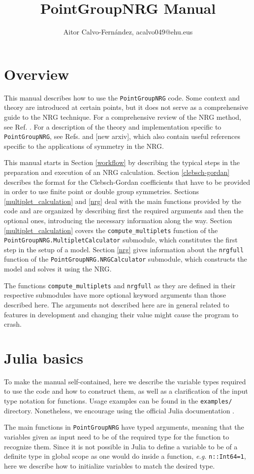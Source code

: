 \documentclass[notitlepage]{article}
\title{PointGroupNRG Manual}
\author{Aitor Calvo-Fernández, acalvo049@ehu.eus}
\begin{document}
\maketitle

\tableofcontents

\section{Overview}\label{overview}
This manual describes how to use the \texttt{PointGroupNRG}
code. Some context and theory are introduced at certain
points, but it does not serve as a comprehensive guide to
the NRG technique. For a comprehensive review of the NRG method, see
Ref. \cite{bulla2008}. For a description of the theory and
implementation specific to \texttt{PointGroupNRG}, see Refs.
\cite{calvo-fernandez2024} and [new arxiv], which also
contain useful references specific to the applications of
symmetry in the NRG.
\par
This manual starts in Section \ref{workflow} by describing
the typical steps in the preparation and execution of an NRG
calculation. Section \ref{clebsch-gordan} describes the
format for the Clebsch-Gordan coefficients that have to be
provided in order to use finite point or double group
symmetries. Sections \ref{multiplet_calculation} and
\ref{nrg} deal with the main functions provided
by the code and are organized by describing first the
required arguments and then the optional ones, introducing
the necessary information along the way. Section
\ref{multiplet_calculation} covers the
\texttt{compute\_multiplets} function of the
\texttt{PointGroupNRG.MultipletCalculator} submodule, which
constitutes the first step in the setup of a model. Section
\ref{nrg} gives information about the
\texttt{nrgfull} function of the
\texttt{PointGroupNRG.NRGCalculator} submodule, which
constructs the model and solves it using the NRG.
\par
The functions \texttt{compute\_multiplets} and
\texttt{nrgfull} as they are defined in their respective
submodules have more optional keyword arguments than those
described here. The arguments not described here
are in general related to features in development and
changing their value might cause the program to crash.

\section{Julia basics}
To make the manual self-contained, here we describe the
variable types required to use the code and how to construct
them, as well as a clarification of the input type notation
for functions. Usage examples can be found in the
\texttt{examples/} directory. Nonetheless, we encourage
using the official Julia documentation \cite{juliadoc}.
\par
The main functions in \texttt{PointGroupNRG} have typed
arguments, meaning that the variables given as input need to
be of the required type for the function to recognize them. 
Since it is not possible in Julia to define a variable to be
of a definite type in global scope as one would do inside a
function, \textit{e.g.} \texttt{n::Int64=1}, here we describe 
how to initialize variables to match the desired type.
\end{document}
